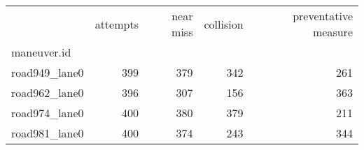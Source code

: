 \begin{tabular}{lrrrr}
\toprule
{} &  attempts &  near miss &  collision &  preventative measure \\
maneuver.id   &           &            &            &                       \\
\midrule
road949\_lane0 &       399 &        379 &        342 &                   261 \\
road962\_lane0 &       396 &        307 &        156 &                   363 \\
road974\_lane0 &       400 &        380 &        379 &                   211 \\
road981\_lane0 &       400 &        374 &        243 &                   344 \\
\bottomrule
\end{tabular}
